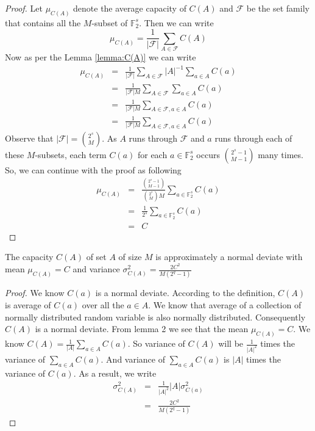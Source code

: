 \begin{proof}
Let $\mu_{C(A)}$ denote the average capacity of $C(A)$ and $\mathcal{F}$ be the set family that contains all the $M$-subset of $\mathbb{F}_{2}^{s}$. Then we can write
$$\mu_{C(A)} = \frac{1}{|\mathcal{F}|}\displaystyle\sum_{A \in \mathcal{F}}C(A)$$
Now as per the Lemma \ref{lemma:C(A)} we can write
\begin{eqnarray*}
\mu_{C(A)} &=& \frac{1}{|\mathcal{F}|}\displaystyle\sum_{A \in \mathcal{F}} |A|^{-1}\displaystyle\sum_{a \in A}C(a)\\
&=& \frac{1}{|\mathcal{F}|M}\displaystyle\sum_{A \in \mathcal{F}} \displaystyle\sum_{a \in A}C(a)\\
&=& \frac{1}{|\mathcal{F}|M}\displaystyle\sum_{A \in \mathcal{F}, a \in A}C(a)\\
&=& \frac{1}{|\mathcal{F}|M}\displaystyle\sum_{A \in \mathcal{F}, a \in A}C(a)
\end{eqnarray*} Observe that $|\mathcal{F}| = \binom{2^s}{M}$. As $A$ runs through $\mathcal{F}$ and $a$ runs through each of these $M$-subsets, each term $C\left(a\right)$ for each $a \in \mathbb{F}_2^s$ occurs $\binom{2^s - 1}{M-1}$ many times. So, we can continue with the proof as following
\begin{eqnarray*}
\mu_{C(A)} &=& \frac{\binom{2^s - 1}{M-1}}{\binom{2^s}{M}M}\displaystyle\sum_{a \in \mathbb{F}_2^s}C(a) \\
&=& \frac{1}{2^s}\displaystyle\sum_{a \in \mathbb{F}_{2}^{s}}C(a) \\
&=& C
\end{eqnarray*}

\end{proof}
\begin{corollary} \label{corollary C A}
The capacity $C(A)$ of set $A$ of size $M$ is approximately a normal deviate with mean $\mu_{C(A)} = C$ and variance $\sigma^{2}_{C(A)} = \frac{2C^2}{M(2^q-1)}$
\end{corollary}
\begin{proof}
We know $C\left(a\right)$ is a normal deviate. According to the definition, $C\left(A\right)$ is average of $C\left(a\right)$ over all the $a \in A$. We know that average of a collection of normally distributed random variable is also normally distributed. Consequently $C\left(A\right)$ is a normal deviate. From lemma 2 we see that the mean $\mu_{C(A)} = C$. We know $C\left(A\right) = \frac{1}{|A|}\displaystyle\sum_{a \in A}C\left(a\right)$. So variance of $C\left(A\right)$ will be $\frac{1}{|A|^2}$ times the variance of $\displaystyle\sum_{a \in A}C\left(a\right)$. And variance of $\displaystyle\sum_{a \in A}C\left(a\right)$ is $|A|$ times the variance of $C\left(a\right)$. As a result, we write
\begin{eqnarray*}
\sigma^{2}_{C(A)} &=& \frac{1}{|A|^{2}}|A|\sigma_{C(a)}^{2}\\
&=& \frac{2C^2}{M(2^q-1)}
\end{eqnarray*}
\end{proof}

